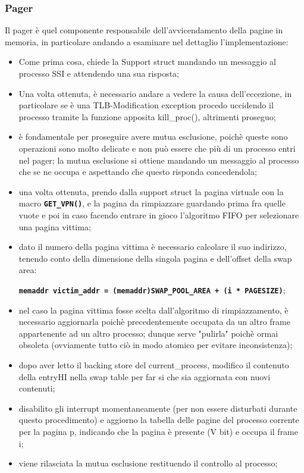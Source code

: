\documentclass{article}
\begin{document}
\subsubsection{Pager}
Il pager è quel componente responsabile dell'avvicendamento della pagine in memoria, in particolare andando a esaminare nel dettaglio l'implementazione:
\begin{itemize}
  \item Come prima cosa, chiede la Support struct mandando un messaggio al processo SSI e attendendo una sua risposta; 
  \item Una volta ottenuta, è necessario andare a vedere la causa dell'eccezione, in particolare se è una TLB-Modification exception procedo uccidendo il processo tramite la funzione apposita kill\_proc(), altrimenti proseguo;
  \item è fondamentale per proseguire avere mutua esclusione, poichè queste sono operazioni sono molto delicate e non può essere che più di un processo entri nel pager; la mutua esclusione si ottiene mandando un messaggio al processo che se ne occupa e aspettando che questo risponda concedendola;
  \item una volta ottenuta, prendo dalla support struct la pagina virtuale con la macro \texttt{\textbf{GET\_VPN()}}, e la pagina da rimpiazzare guardando prima fra quelle vuote e poi in caso facendo entrare in gioco l'algoritmo FIFO per selezionare una pagina vittima;
  \item dato il numero della pagina vittima è necessario calcolare il suo indirizzo, tenendo conto della dimensione della singola pagina e dell'offset della swap area: 
  
  \begin{center}
      \texttt{\textbf{memaddr victim\_addr = (memaddr)SWAP\_POOL\_AREA + (i * PAGESIZE)}}; 
  \end{center}
  
  \item nel caso la pagina vittima fosse scelta dall'algoritmo di rimpiazzamento, è necessario aggiornarla poichè precedentemente occupata da un altro frame appartenente ad un altro processo; dunque serve "pulirla" poichè ormai obsoleta (ovviamente tutto ciò in modo atomico per evitare inconsistenza);

  \item dopo aver letto il backing store del current\_process, modifico il contenuto della entryHI nella swap table per far si che sia aggiornata con nuovi contenuti; 

  \item disabilito gli interrupt momentaneamente (per non essere disturbati durante questo procedimento) e aggiorno la tabella delle pagine del processo corrente per la pagina p, indicando che la pagina è presente (V bit) e occupa il frame i;

  \item viene rilasciata la mutua esclusione restituendo il controllo al processo;
\end{itemize}
\end{document}

